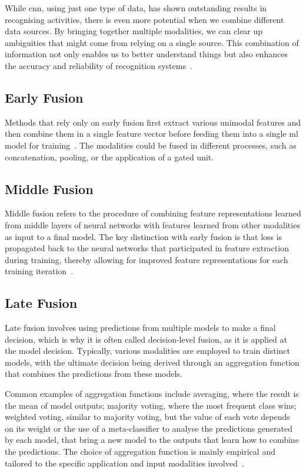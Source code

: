 While \acs{cnn}, using just one type of data, has shown outstanding results in recognising activities, there is even more potential when we combine different data sources. By bringing together multiple modalities, we can clear up ambiguities that might come from relying on a single source. This combination of information not only enables us to better understand things but also enhances the accuracy and reliability of recognition systems~\cite{gadzicki_early_2020}.

\subsection{Early Fusion}

Methods that rely only on early fusion first extract various unimodal features and then combine them in a single feature vector before feeding them into a single \ac{ml} model for training~\cite{huang_fusion_2020}.
The modalities could be fused in different processes, such as concatenation, pooling, or the application of a gated unit.

\subsection{Middle Fusion}
Middle fusion refers to the procedure of combining feature representations learned from middle layers of neural networks with features learned from other modalities as input to a final model. The key distinction with early fusion is that loss is propagated back to the neural networks that participated in feature extraction during training, thereby allowing for improved feature representations for each training iteration~\cite{gadzicki_early_2020}. 


\subsection{Late Fusion}

Late fusion involves using predictions from multiple models to make a final decision, which is why it is often called decision-level fusion, as it is applied at the model decision. Typically, various modalities are employed to train distinct models, with the ultimate decision being derived through an aggregation function that combines the predictions from these models.

Common examples of aggregation functions include averaging, where the result is the mean of model outputs; majority voting, where the most frequent class wins; weighted voting, similar to majority voting, but the value of each vote depends on its weight or the use of a meta-classifier to analyse the predictions generated by each model, that bring a new model to the outputs that learn how to combine the predictions. The choice of aggregation function is mainly empirical and tailored to the specific application and input modalities involved~\cite{gadzicki_early_2020}.

